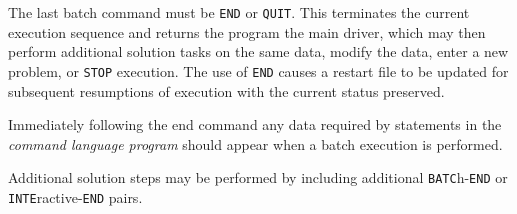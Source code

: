 \headb

The last batch command must be {\tt END} or {\tt QUIT}.
This terminates the current execution sequence and returns the program
the main driver, which may then perform additional
solution tasks on the same data, modify the data,
enter a new problem, or {\tt STOP} execution.
The use of {\tt END} causes a restart file to be
updated for subsequent resumptions of execution with the
current status preserved.

Immediately following the end command any data
required by statements in the {\it command language program} should appear
when a batch execution is performed.

Additional solution steps may be performed by including additional
{\tt BATC}h-{\tt END} or {\tt INTE}ractive-{\tt END} pairs.
\vfill\eject
